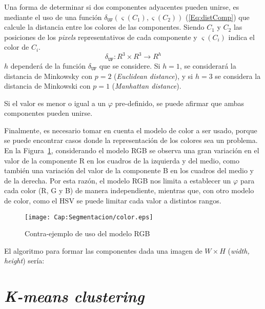 Una forma de determinar si dos componentes adyacentes pueden unirse, es mediante
 el uso de una función $\delta_{\mathtt{UF}} (\varsigma (C_1), \varsigma (C_2))$
  (\ref{Eq:distComp}) que calcule la distancia entre los colores de las 
  componentes. Siendo $C_1$ y $C_2$ las posiciones de los \textit{pixels} 
  representativos de cada componente y $\varsigma(C_i)$ indica el color de $C_i$. 
\begin{equation}
	\delta_{\mathtt{UF}}:R^3\times R^3 \rightarrow R^h
	\label{Eq:distComp}
\end{equation}
$h$ dependerá de la función $\delta_{\mathtt{UF}}$ que se considere. Si $h=1$, 
se considerará la distancia de Minkowsky con $p=2$ (\textit{Euclidean 
distance}), y si $h=3$ se considera la distancia de Minkowski con $p=1$ 
(\textit{Manhattan distance}).\cite{Cordeiro:2012:Minkowski}

Si el valor es menor o igual a un $\varphi$ pre-definido, se puede afirmar que
 ambas componentes pueden unirse.

Finalmente, es necesario tomar en cuenta el modelo de color a ser usado, porque 
se puede encontrar casos donde la representación de los colores sea un problema.
 En la Figura~\ref{fig:cap-segmentacion:contraejemplo-rgb}, considerando el 
 modelo RGB se observa una gran variación en el valor de la componente R en los 
 cuadros de la izquierda y del medio, como también una variación del valor de 
 la componente B en los cuadros del medio y de la derecha. Por esta razón, el
  modelo RGB nos limita a establecer un $\varphi$ para cada color (R, G y B) de
   manera independiente, mientras que, con otro modelo de color, como el HSV se
    puede limitar cada valor a distintos rangos.

\begin{figure}
	\centering
	\texttt{[image: Cap:Segmentacion/color.eps]}
	\caption{Contra-ejemplo de uso del modelo RGB}
	\label{fig:cap-segmentacion:contraejemplo-rgb}
\end{figure}

El algoritmo para formar las componentes dada una imagen de $W\times H$
 (\textit{width, height}) sería:



\section{\textit{K-means clustering}}

